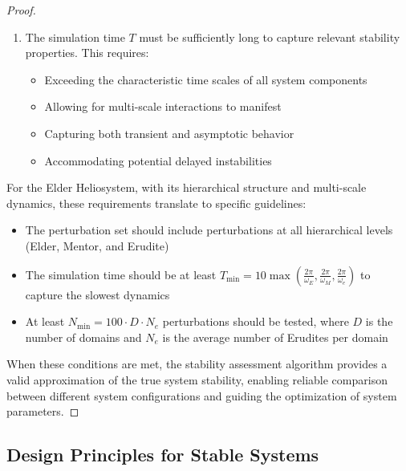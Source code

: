 \begin{proof}
\begin{enumerate}
    \item The simulation time $T$ must be sufficiently long to capture relevant stability properties. This requires:
    \begin{itemize}
        \item Exceeding the characteristic time scales of all system components
        \item Allowing for multi-scale interactions to manifest
        \item Capturing both transient and asymptotic behavior
        \item Accommodating potential delayed instabilities
    \end{itemize}
\end{enumerate}

For the Elder Heliosystem, with its hierarchical structure and multi-scale dynamics, these requirements translate to specific guidelines:
\begin{itemize}
    \item The perturbation set should include perturbations at all hierarchical levels (Elder, Mentor, and Erudite)
    \item The simulation time should be at least $T_{\min} = 10 \max\left(\frac{2\pi}{\omega_E}, \frac{2\pi}{\omega_M}, \frac{2\pi}{\omega_e}\right)$ to capture the slowest dynamics
    \item At least $N_{\min} = 100 \cdot D \cdot N_e$ perturbations should be tested, where $D$ is the number of domains and $N_e$ is the average number of Erudites per domain
\end{itemize}

When these conditions are met, the stability assessment algorithm provides a valid approximation of the true system stability, enabling reliable comparison between different system configurations and guiding the optimization of system parameters.
\end{proof}

\subsection{Design Principles for Stable Systems}

